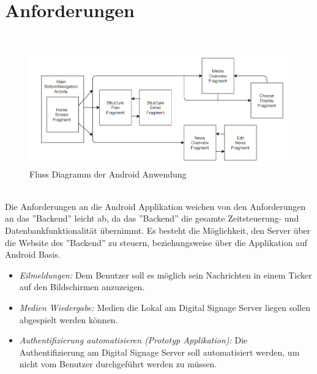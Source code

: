 \section{Anforderungen}
\\
\begin{figure}[H]
\centering
\includegraphics[width=1.0\textwidth]{images/06_AndroidApp/06_AndroidArch}
\caption{Fluss Diagramm der Android Anwendung}
\label{fig:mediaNav}
\end{figure}
\\
Die Anforderungen an die Android Applikation weichen von den Anforderungen an das ''Backend'' leicht ab, da das ''Backend'' die gesamte Zeitsteuerung- und Datenbankfunktionalität übernimmt. Es besteht die Möglichkeit, den Server über die Website des ''Backend'' zu steuern, beziehungsweise über die Applikation auf Android Basis. 
\begin{itemize}
	\item {\em Eilmeldungen:} Dem Benutzer soll es möglich sein Nachrichten in einem Ticker auf den Bildschirmen anzuzeigen.
	
	\item {\em Medien Wiedergabe:} Medien die Lokal am Digital Signage Server liegen sollen abgespielt werden können.
		
	\item {\em Authentifizierung automatisieren (Prototyp Applikation):} Die Authentifizierung am Digital Signage Server soll automatisiert werden, um nicht vom Benutzer durchgeführt werden zu müssen.  		
\end{itemize}
